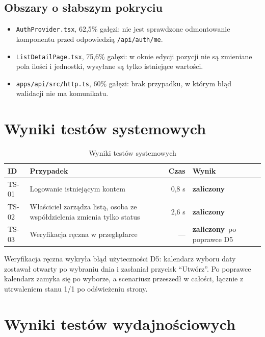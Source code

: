 \documentclass[a4paper,11pt]{article}
\newcommand{\code}[1]{\texttt{\small #1}}
\newcommand{\zal}{\textcolor{ok}{\textbf{zaliczony}}}
\begin{document}
\subsection{Obszary o słabszym pokryciu}
\begin{itemize}
  \item \code{AuthProvider.tsx}, 62,5\% gałęzi: nie jest sprawdzone odmontowanie komponentu
        przed odpowiedzią \code{/api/auth/me}.
  \item \code{ListDetailPage.tsx}, 75,6\% gałęzi: w oknie edycji pozycji nie są zmieniane
        pola ilości i jednostki, wysyłane są tylko istniejące wartości.
  \item \code{apps/api/src/http.ts}, 60\% gałęzi: brak przypadku, w którym błąd walidacji
        nie ma komunikatu.
\end{itemize}

\section{Wyniki testów systemowych}

\begin{table}[H]
\centering\small
\begin{tabularx}{\textwidth}{@{}l L r l@{}}
\toprule
\textsf{\textbf{ID}} & \textsf{\textbf{Przypadek}} & \textsf{\textbf{Czas}} & \textsf{\textbf{Wynik}}\\
\midrule
TS-01 & Logowanie istniejącym kontem & 0,8 s & \zal\\
TS-02 & Właściciel zarządza listą, osoba ze współdzielenia zmienia tylko status & 2,6 s & \zal\\
TS-03 & Weryfikacja ręczna w przeglądarce & — & \zal\ po poprawce D5\\
\bottomrule
\end{tabularx}
\caption{Wyniki testów systemowych}
\end{table}

Weryfikacja ręczna wykryła błąd użyteczności D5: kalendarz wyboru daty zostawał otwarty
po wybraniu dnia i zasłaniał przycisk \enquote{Utwórz}. Po poprawce kalendarz zamyka się
po wyborze, a scenariusz przeszedł w całości, łącznie z utrwaleniem stanu 1/1 po odświeżeniu
strony.

\section{Wyniki testów wydajnościowych}
\end{document}
